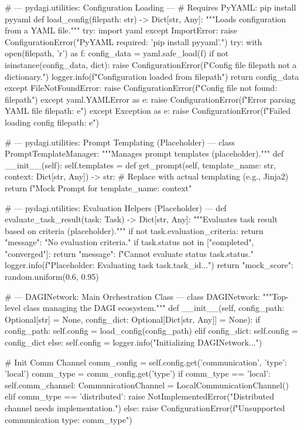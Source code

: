 \documentclass{amsbook}
\theoremstyle{definition}
\theoremstyle{remark}
\numberwithin{equation}{chapter} %
\begin{document}
\begin{python}
# --- pydagi.utilities: Configuration Loading ---
# Requires PyYAML: pip install pyyaml
def load_config(filepath: str) -> Dict[str, Any]:
    """Loads configuration from a YAML file."""
    try: import yaml
    except ImportError: raise ConfigurationError("PyYAML required: 'pip install pyyaml'.")
    try:
        with open(filepath, 'r') as f: config_data = yaml.safe_load(f)
        if not isinstance(config_data, dict): raise ConfigurationError(f"Config file {filepath} not a dictionary.")
        logger.info(f"Configuration loaded from {filepath}")
        return config_data
    except FileNotFoundError: raise ConfigurationError(f"Config file not found: {filepath}")
    except yaml.YAMLError as e: raise ConfigurationError(f"Error parsing YAML file {filepath}: {e}")
    except Exception as e: raise ConfigurationError(f"Failed loading config {filepath}: {e}")

# --- pydagi.utilities: Prompt Templating (Placeholder) ---
class PromptTemplateManager:
     """Manages prompt templates (placeholder)."""
     def __init__(self): self.templates = {}
     def get_prompt(self, template_name: str, context: Dict[str, Any]) -> str:
          # Replace with actual templating (e.g., Jinja2)
          return f"Mock Prompt for {template_name}: {context}"

# --- pydagi.utilities: Evaluation Helpers (Placeholder) ---
def evaluate_task_result(task: Task) -> Dict[str, Any]:
     """Evaluates task result based on criteria (placeholder)."""
     if not task.evaluation_criteria: return {"message": "No evaluation criteria."}
     if task.status not in ["completed", "converged"]: return {"message": f"Cannot evaluate status {task.status}."}
     logger.info(f"Placeholder: Evaluating task {task.task_id}...")
     return {"mock_score": random.uniform(0.6, 0.95)}


# --- DAGINetwork: Main Orchestration Class ---
class DAGINetwork:
    """Top-level class managing the DAGI ecosystem."""
    def __init__(self, config_path: Optional[str] = None, config_dict: Optional[Dict[str, Any]] = None):
        if config_path: self.config = load_config(config_path)
        elif config_dict: self.config = config_dict
        else: self.config = {}
        logger.info("Initializing DAGINetwork...")

        # Init Comm Channel
        comm_config = self.config.get('communication', {'type': 'local'})
        comm_type = comm_config.get('type')
        if comm_type == 'local': self.comm_channel: CommunicationChannel = LocalCommunicationChannel()
        elif comm_type == 'distributed': raise NotImplementedError("Distributed channel needs implementation.")
        else: raise ConfigurationError(f"Unsupported communication type: {comm_type}")


\end{python}
\end{document}
